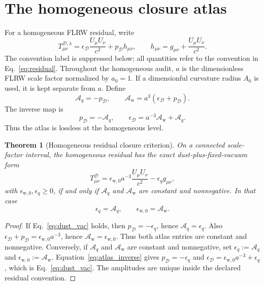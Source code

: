 \documentclass[
  aps,
  prd,
  reprint,
  superscriptaddress,
  floatfix,
  nofootinbib,
  longbibliography
]{revtex4-2}
\theoremstyle{plain}
\newtheorem{theorem}{Theorem}
\theoremstyle{definition}
\theoremstyle{remark}
\newcommand{\D}{\mathcal D}
\newcommand{\wind}{\mathrm w}
\newcommand{\Aq}{\mathcal A_q}
\newcommand{\Aw}{\mathcal A_{\mathrm w}}
\begin{document}
\section{The homogeneous closure atlas}

For a homogeneous FLRW residual, write
\begin{equation}
T^{\D,\lambda}_{\mu\nu}
=\epsilon_\D\frac{U_\mu U_\nu}{c^2}+p_\D h_{\mu\nu},
\qquad
h_{\mu\nu}=g_{\mu\nu}+\frac{U_\mu U_\nu}{c^2}.
\label{eq:perfect_residual}
\end{equation}
The convention label is suppressed below; all quantities refer to the convention in Eq.~\eqref{eq:residual}.  Throughout the homogeneous audit, \(a\) is the dimensionless FLRW scale factor normalized by \(a_0=1\).  If a dimensionful curvature radius \(A_0\) is used, it is kept separate from \(a\).  Define
\begin{equation}
\boxed{
\Aq=-p_\D,
\qquad
\Aw=a^3(\epsilon_\D+p_\D).
}
\label{eq:atlas}
\end{equation}
The inverse map is
\begin{equation}
p_\D=-\Aq,
\qquad
\epsilon_\D=a^{-3}\Aw+\Aq.
\label{eq:atlas_inverse}
\end{equation}
Thus the atlas is lossless at the homogeneous level.

\begin{theorem}[Homogeneous residual closure criterion]
On a connected scale-factor interval, the homogeneous residual has the exact dust-plus-fixed-vacuum form
\begin{equation}
T^{\D}_{\mu\nu}=\epsilon_{\wind,0}a^{-3}\frac{U_\mu U_\nu}{c^2}-\epsilon_q g_{\mu\nu},
\label{eq:dust_vac}
\end{equation}
with \(\epsilon_{\wind,0},\epsilon_q\ge0\), if and only if \(\Aq\) and \(\Aw\) are constant and nonnegative.  In that case
\begin{equation}
\epsilon_q=\Aq,
\qquad
\epsilon_{\wind,0}=\Aw.
\end{equation}
\end{theorem}

\begin{proof}
If Eq.~\eqref{eq:dust_vac} holds, then \(p_\D=-\epsilon_q\), hence \(\Aq=\epsilon_q\).  Also \(\epsilon_\D+p_\D=\epsilon_{\wind,0}a^{-3}\), hence \(\Aw=\epsilon_{\wind,0}\).  Thus both atlas entries are constant and nonnegative.  Conversely, if \(\Aq\) and \(\Aw\) are constant and nonnegative, set \(\epsilon_q:=\Aq\) and \(\epsilon_{\wind,0}:=\Aw\).  Equation~\eqref{eq:atlas_inverse} gives \(p_\D=-\epsilon_q\) and \(\epsilon_\D=\epsilon_{\wind,0}a^{-3}+\epsilon_q\), which is Eq.~\eqref{eq:dust_vac}.  The amplitudes are unique inside the declared residual convention.
\end{proof}
\end{document}

